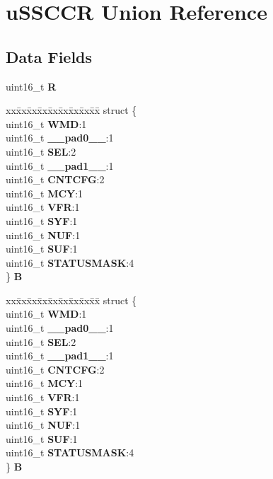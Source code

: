 \hypertarget{unionuSSCCR}{}\section{u\+S\+S\+C\+CR Union Reference}
\label{unionuSSCCR}
\subsection*{Data Fields}
\begin{DoxyCompactItemize}
\item 
\mbox{\label{unionuSSCCR_ab9d26822ef429afb46947a41cdb1b0f6}} 
uint16\+\_\+t {\bfseries R}
\item 
\mbox{\label{unionuSSCCR_a0a988acc5c0413c5f329fdd334ba6dfd}} 
\begin{tabbing}
xx\=xx\=xx\=xx\=xx\=xx\=xx\=xx\=xx\=\kill
struct \{\\
\>uint16\_t {\bfseries WMD}:1\\
\>uint16\_t {\bfseries \_\_pad0\_\_}:1\\
\>uint16\_t {\bfseries SEL}:2\\
\>uint16\_t {\bfseries \_\_pad1\_\_}:1\\
\>uint16\_t {\bfseries CNTCFG}:2\\
\>uint16\_t {\bfseries MCY}:1\\
\>uint16\_t {\bfseries VFR}:1\\
\>uint16\_t {\bfseries SYF}:1\\
\>uint16\_t {\bfseries NUF}:1\\
\>uint16\_t {\bfseries SUF}:1\\
\>uint16\_t {\bfseries STATUSMASK}:4\\
\} {\bfseries B}\\

\end{tabbing}\item 
\mbox{\label{unionuSSCCR_ac16c85b7021f851b97fb03d183754568}} 
\begin{tabbing}
xx\=xx\=xx\=xx\=xx\=xx\=xx\=xx\=xx\=\kill
struct \{\\
\>uint16\_t {\bfseries WMD}:1\\
\>uint16\_t {\bfseries \_\_pad0\_\_}:1\\
\>uint16\_t {\bfseries SEL}:2\\
\>uint16\_t {\bfseries \_\_pad1\_\_}:1\\
\>uint16\_t {\bfseries CNTCFG}:2\\
\>uint16\_t {\bfseries MCY}:1\\
\>uint16\_t {\bfseries VFR}:1\\
\>uint16\_t {\bfseries SYF}:1\\
\>uint16\_t {\bfseries NUF}:1\\
\>uint16\_t {\bfseries SUF}:1\\
\>uint16\_t {\bfseries STATUSMASK}:4\\
\} {\bfseries B}\\


\end{tabbing}
\end{DoxyCompactItemize}
